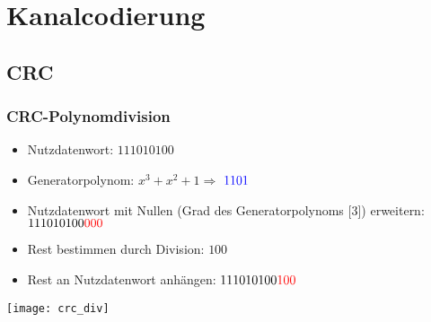 \section{Kanalcodierung}
\subsection{CRC}
\subsubsection{CRC-Polynomdivision}
\begin{itemize}
    \item Nutzdatenwort: $111010100$
    \item Generatorpolynom: $x^3 + x^2 + 1 \Rightarrow$ $\textcolor{blue}{1101}$
    \item Nutzdatenwort mit Nullen (Grad des Generatorpolynoms [3]) erweitern: $111010100\textcolor{red}{000}$
    \item Rest bestimmen durch Division: $100$
    \item Rest an Nutzdatenwort anhängen: $111010100\textcolor{red}{100}$
\end{itemize}
\texttt{[image: crc\_div]}
